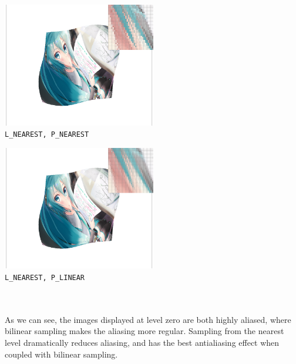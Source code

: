 \documentclass[11pt]{article}
\begin{document}
{
    \centering
    \begin{minipage}[htbp]{190pt}
        \centering\includegraphics[width=190pt]{screenshot_2-16_21-23-40.png}\\\verb|L_NEAREST, P_NEAREST|
    \end{minipage}
    \begin{minipage}[htbp]{190pt}
        \centering\includegraphics[width=190pt]{screenshot_2-16_21-23-45.png}\\\verb|L_NEAREST, P_LINEAR|
    \end{minipage}
}\\\vspace{1pt}\\
As we can see, the images displayed at level zero are both highly aliased, where bilinear sampling makes the aliasing more regular. Sampling from the nearest level dramatically reduces aliasing, and has the best antialiasing effect when coupled with bilinear sampling.
\end{document}
